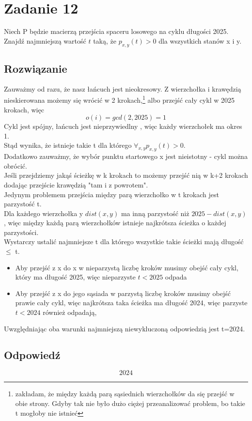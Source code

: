\section{Zadanie 12}
Niech P będzie macierzą przejścia spaceru losowego na cyklu długości 2025.
Znajdź najmniejszą wartość \(t\) taką, że \(p_{x,y}(t) > 0\) dla wszystkich stanów x i y.
\subsection*{Rozwiązanie}
Zauważmy od razu, że nasz łańcuch jest nieokresowy. Z wierzchołka i krawędzią nieskierowana możemy się wrócić w 2 krokach,\footnote{zakładam, że między każdą parą sąsiednich wierzchołków da się przejść w obie strony. Gdyby tak nie było dużo ciężej przeanalizować problem, bo takie t mogłoby nie istnieć} albo przejść cały cykl w 2025 krokach, więc \[o(i)=gcd(2,2025)=1\] Cykl jest spójny, łańcuch jest nieprzywiedlny , więc każdy wierzchołek ma okres 1.\\
Stąd wynika, że istnieje takie t dla którego \(\forall_{x,y} p_{x,y}(t)>0\).\\
Dodatkowo zauważmy, że wybór punktu startowego x jest nieistotny - cykl można obrócić.\\
Jeśli przejdziemy jakąś ścieżkę w k krokach to możemy przejść nią w k+2 krokach dodając przejście krawędzią "tam i z powrotem".\\
Jedynym problemem przejścia między parą wierzchołko w t krokach jest parzystość t.\\
Dla każdego wierzchołka y \(dist(x,y)\) ma inną parzystość niż \(2025-dist(x,y)\), więc między każdą parą wierzchołków istnieje najkrótsza ścieżka o każdej parzystości.\\
Wystarczy ustalić najmniejsze t dla którego wszystkie takie ścieżki mają długość \(\le\) t.
\begin{itemize}
	\item Aby przejść z x do x w nieparzystą liczbę kroków musimy obejść cały cykl, który ma długość 2025, więc nieparzyste \(t<2025\) odpada
	\item Aby przejść z x do jego sąsiada w parzystą liczbę kroków musimy obejść prawie cały cykl, więc najkrótsza taka ścieżka ma długość 2024, więc parzyste \(t<2024\) również odpadają,
\end{itemize}
Uwzględniając oba warunki najmniejszą niewykluczoną odpowiedzią jest t=2024.
\subsection*{Odpowiedź}
\[
	\boxed{\text{2024}}
\]
